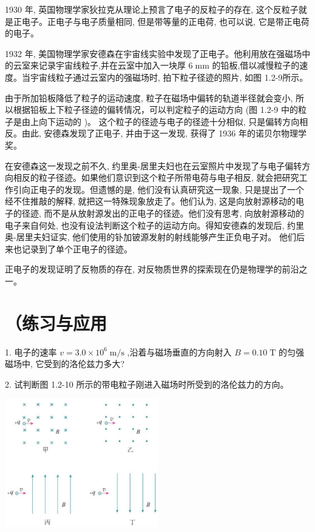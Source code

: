 \documentclass[10pt]{article}
\begin{document}
1930 年, 英国物理学家狄拉克从理论上预言了电子的反粒子的存在, 这个反粒子就是正电子。正电子与电子质量相同, 但是带等量的正电荷, 也可以说, 它是带正电荷的电子。

1932 年, 美国物理学家安德森在宇宙线实验中发现了正电子。他利用放在强磁场中的云室来记录宇宙线粒子,并在云室中加入一块厚 \(6\mathrm{\;{mm}}\) 的铅板,借以减慢粒子的速度。当宇宙线粒子通过云室内的强磁场时, 拍下粒子径迹的照片, 如图 1.2-9所示。

由于所加铅板降低了粒子的运动速度, 粒子在磁场中偏转的轨道半径就会变小, 所以根据铅板上下粒子径迹的偏转情况，可以判定粒子的运动方向 (图 1.2-9 中的粒子是由上向下运动的 )。 这个粒子的径迹与电子的径迹十分相似, 只是偏转方向相反。由此, 安德森发现了正电子, 并由于这一发现, 获得了 1936 年的诺贝尔物理学奖。

在安德森这一发现之前不久, 约里奥-居里夫妇也在云室照片中发现了与电子偏转方向相反的粒子径迹。如果他们意识到这个粒子所带电荷与电子相反, 就会把研究工作引向正电子的发现。但遗憾的是, 他们没有认真研究这一现象, 只是提出了一个经不住推敲的解释, 就把这一特殊现象放走了。他们认为, 这是向放射源移动的电子的径迹, 而不是从放射源发出的正电子的径迹。他们没有思考, 向放射源移动的电子来自何处, 也没有设法判断这个粒子的运动方向。得知安德森的发现后, 约里奥-居里夫妇证实, 他们使用的钋加铍源发射的射线能够产生正负电子对。 他们后来也记录到了单个正电子的径迹。

正电子的发现证明了反物质的存在, 对反物质世界的探索现在仍是物理学的前沿之一。

\section*{（练习与应用}

1. 电子的速率 \(v = {3.0} \times {10}^{6}\mathrm{\;m}/\mathrm{s}\) ,沿着与磁场垂直的方向射入 \(B = {0.10}\mathrm{\;T}\) 的匀强磁场中, 它受到的洛伦兹力多大?

2. 试判断图 1.2-10 所示的带电粒子刚进入磁场时所受到的洛伦兹力的方向。

\begin{center}
\includegraphics[max width=0.5\textwidth]{images/01910e72-c5b7-7ed5-a6d4-fb3a5faefc32_17_368660.jpg}
\end{center}
\end{document}
